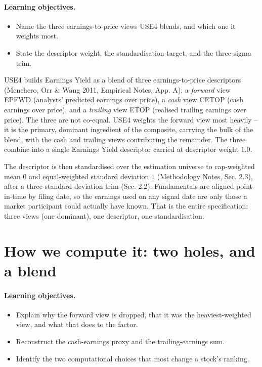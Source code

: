 \documentclass[11pt]{article}
\theoremstyle{definition}
\theoremstyle{plain}
\theoremstyle{remark}
\begin{document}
\paragraph{Learning objectives.}
\begin{itemize}[leftmargin=1.4em,topsep=2pt]
  \item Name the three earnings-to-price views USE4 blends, and which one it weights most.
  \item State the descriptor weight, the standardisation target, and the three-sigma trim.
\end{itemize}

USE4 builds Earnings Yield as a blend of three earnings-to-price descriptors (Menchero, Orr \& Wang 2011, Empirical Notes, App. A): a \emph{forward} view EPFWD (analysts' predicted earnings over price), a \emph{cash} view CETOP (cash earnings over price), and a \emph{trailing} view ETOP (realised trailing earnings over price). The three are not co-equal. USE4 weights the forward view most heavily -- it is the primary, dominant ingredient of the composite, carrying the bulk of the blend, with the cash and trailing views contributing the remainder. The three combine into a single Earnings Yield descriptor carried at descriptor weight $1.0$.

The descriptor is then standardised over the estimation universe to cap-weighted mean $0$ and equal-weighted standard deviation $1$ (Methodology Notes, Sec. 2.3), after a three-standard-deviation trim (Sec. 2.2). Fundamentals are aligned point-in-time by filing date, so the earnings used on any signal date are only those a market participant could actually have known. That is the entire specification: three views (one dominant), one descriptor, one standardisation.

\section{How we compute it: two holes, and a blend}\label{sec:compute}

\paragraph{Learning objectives.}
\begin{itemize}[leftmargin=1.4em,topsep=2pt]
  \item Explain why the forward view is dropped, that it was the heaviest-weighted view, and what that does to the factor.
  \item Reconstruct the cash-earnings proxy and the trailing-earnings sum.
  \item Identify the two computational choices that most change a stock's ranking.
\end{itemize}
\end{document}
